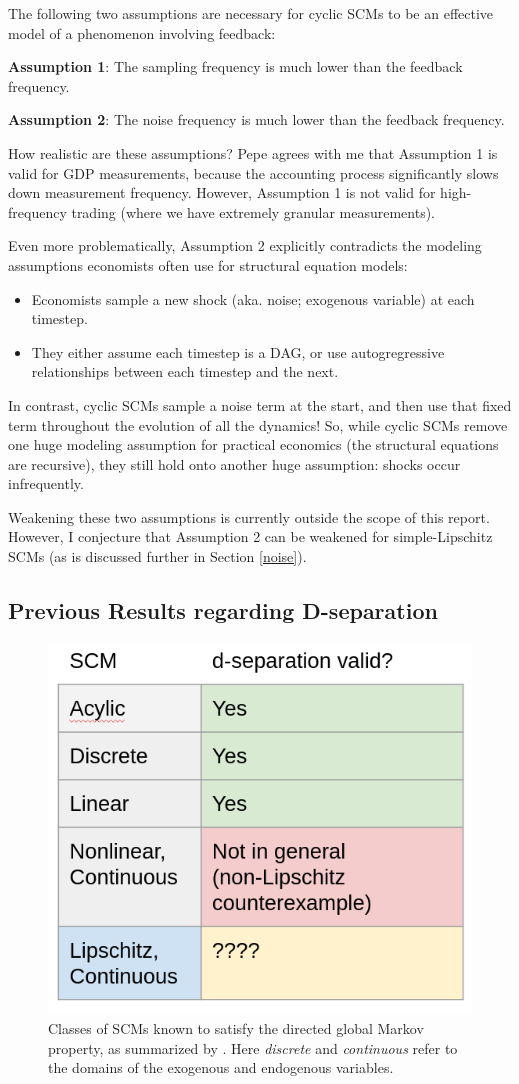 \documentclass[12pt]{article}
\begin{document}
The following two assumptions are necessary for cyclic SCMs to be an effective model of a phenomenon involving feedback:

\textbf{Assumption 1}: The sampling frequency is much lower than the feedback frequency.

\textbf{Assumption 2}: The noise frequency is much lower than the feedback frequency.

How realistic are these assumptions? Pepe agrees with me that Assumption 1 is valid for GDP measurements, because the accounting process significantly slows down measurement frequency. However, Assumption 1 is not valid for high-frequency trading (where we have extremely granular measurements).

Even more problematically, Assumption 2 explicitly contradicts the modeling assumptions economists often use for structural equation models:
\begin{itemize}
	\item Economists sample a new shock (aka. noise; exogenous variable) at each timestep.
	\item They either assume each timestep is a DAG, or use autogregressive relationships between each timestep and the next. 
\end{itemize}

In contrast, cyclic SCMs \cite{Foundations} sample a noise term at the start, and then use that fixed term throughout the evolution of all the dynamics! 
So, while cyclic SCMs remove one huge modeling assumption for practical economics (the structural equations are recursive), they still hold onto another huge assumption: shocks occur infrequently. 

Weakening these two assumptions is currently outside the scope of this report. However, I conjecture that Assumption 2 can be weakened for simple-Lipschitz SCMs (as is discussed further in Section \ref{noise}).

\subsection{Previous Results regarding D-separation}

\begin{figure}
\centering
\includegraphics[width=.4\linewidth]{pics/my_own/review.png}
\caption{Classes of SCMs known to satisfy the directed global Markov property, as summarized by \cite{Foundations}. Here \emph{discrete} and \emph{continuous} refer to the domains of the exogenous and endogenous variables.}
\label{fig:review}
\end{figure}
\end{document}
